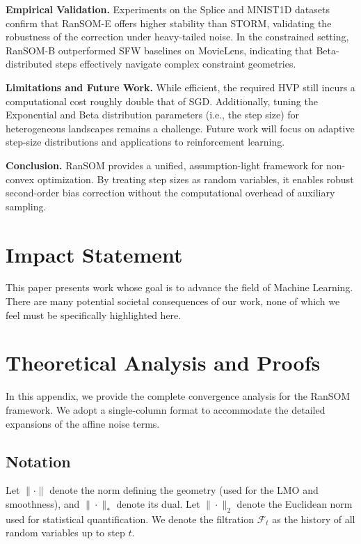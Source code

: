 \documentclass{article}
\theoremstyle{plain}
\theoremstyle{definition}
\theoremstyle{remark}
\begin{document}
\textbf{Empirical Validation.}
Experiments on the Splice and MNIST1D datasets confirm that RanSOM-E offers higher stability than STORM, validating the robustness of the correction under heavy-tailed noise. In the constrained setting, RanSOM-B outperformed SFW baselines on MovieLens, indicating that Beta-distributed steps effectively navigate complex constraint geometries.

\textbf{Limitations and Future Work.}
While efficient, the required HVP still incurs a computational cost roughly double that of SGD. Additionally, tuning the Exponential and Beta distribution parameters (i.e., the step size) for heterogeneous landscapes remains a challenge. Future work will focus on adaptive step-size distributions and applications to reinforcement learning.

\textbf{Conclusion.}
RanSOM provides a unified, assumption-light framework for non-convex optimization. By treating step sizes as random variables, it enables robust second-order bias correction without the computational overhead of auxiliary sampling.
\section*{Impact Statement}

This paper presents work whose goal is to advance the field of Machine
Learning. There are many potential societal consequences of our work, none of which we feel must be specifically highlighted here.









\newpage
\onecolumn
\appendix

\section{Theoretical Analysis and Proofs}
\label{app:theory}

In this appendix, we provide the complete convergence analysis for the RanSOM framework. We adopt a single-column format to accommodate the detailed expansions of the affine noise terms.

\subsection{Notation}
Let $\|\cdot\|$ denote the norm defining the geometry (used for the LMO and smoothness), and $\|\cdot\|_*$ denote its dual. Let $\|\cdot\|_2$ denote the Euclidean norm used for statistical quantification.
We denote the filtration $\mathcal{F}_t$ as the history of all random variables up to step $t$.
\end{document}
